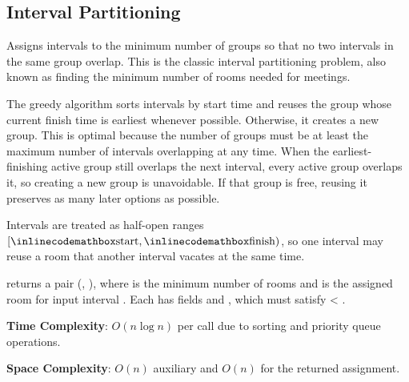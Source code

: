 \subsection{Interval Partitioning}
\label{sec:1.5.5}
Assigns intervals to the minimum number of groups so that no two intervals in the same group overlap. This is the classic interval partitioning problem, also known as finding the minimum number of rooms needed for meetings.

The greedy algorithm sorts intervals by start time and reuses the group whose current finish time is earliest whenever possible. Otherwise, it creates a new group. This is optimal because the number of groups must be at least the maximum number of intervals overlapping at any time. When the earliest-finishing active group still overlaps the next interval, every active group overlaps it, so creating a new group is unavoidable. If that group is free, reusing it preserves as many later options as possible.

Intervals are treated as half-open ranges $[{\inlinecodemath{start}}, {\inlinecodemath{finish}})$, so one interval may reuse a room that another interval vacates at the same time.

\begin{compactitem}
  \item {} returns a pair (, ), where  is the minimum number of rooms and  is the assigned room for input interval . Each  has fields  and , which must satisfy  \textless{} .
\end{compactitem}

\textbf{Time Complexity}: $O(n \log n)$ per call due to sorting and priority queue operations.

\textbf{Space Complexity}: $O(n)$ auxiliary and $O(n)$ for the returned assignment.

